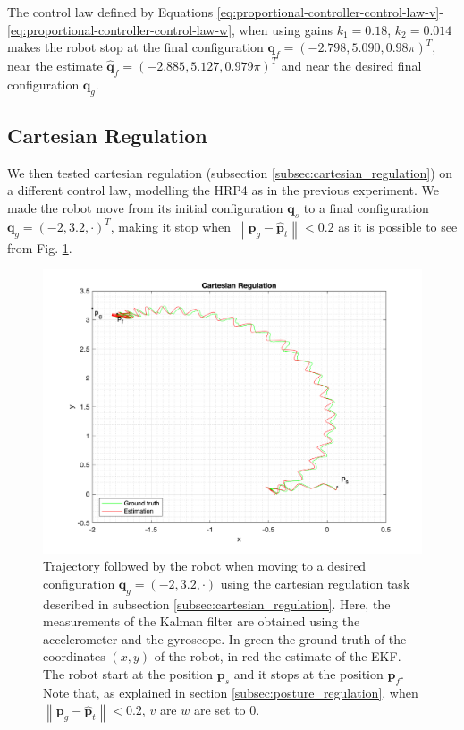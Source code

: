 \documentclass[a4paper]{article}
\begin{document}
The control law defined by Equations
\ref{eq:proportional-controller-control-law-v}-\ref{eq:proportional-controller-control-law-w},
when using gains $k_1=0.18$, $k_2=0.014$ makes the robot stop at the final
configuration $\bm{q}_f = (-2.798, 5.090, 0.98\pi)^T$, near the estimate
$\bm{\hat{q}}_f = (-2.885, 5.127, 0.979\pi)^T$ and
near the desired final configuration $\bm{q}_g$.

\subsection{Cartesian Regulation}
We then tested cartesian regulation (subsection \ref{subsec:cartesian_regulation})
on a different control law, modelling the HRP4 as in the previous experiment.
We made the robot move from its initial
configuration $\bm{q}_s$ to a final configuration $\bm{q}_g = (-2, 3.2, \cdot)^T$,
making it stop when $\left\|\bm{p}_g - \bm{\hat{p}}_t \right\| < 0.2$ as it is
possible to see from Fig. \ref{fig:cartesian_regulation_xy}.
\begin{figure}
    \centering
    \includegraphics[width=\textwidth]{images/cartesian_regulation.png}
    \caption{Trajectory followed by the robot when moving to a desired configuration
        $\bm{q}_g = (-2, 3.2, \cdot)$ using the cartesian regulation task
        described in subsection \ref{subsec:cartesian_regulation}.
        Here, the measurements of the Kalman filter are obtained
        using the accelerometer and the gyroscope. In green the ground truth of the coordinates $(x, y)$ of the
        robot, in red the estimate of the EKF. The robot start at the
        position $\bm{p}_s$ and it stops at the position $\bm{p}_f$. Note that,
        as explained in section \ref{subsec:posture_regulation},
        when $\left\|\bm{p}_g - \bm{\hat{p}}_t \right\| < 0.2$, $v$ are $w$ are set to 0.}
    \label{fig:cartesian_regulation_xy}
\end{figure}
\end{document}
